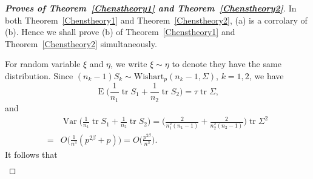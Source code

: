 \documentclass[review]{elsarticle}
\DeclareMathOperator{\mytr}{tr}
\DeclareMathOperator{\myE}{E}
\DeclareMathOperator{\myVar}{Var}
\theoremstyle{plain}
\theoremstyle{definition}
\theoremstyle{remark}
\begin{document}
\begin{proof}[\textbf{Proves of Theorem~\ref{Chenstheory1} and Theorem~\ref{Chenstheory2}}]
    In both Theorem~\ref{Chenstheory1} and Theorem~\ref{Chenstheory2}, (a) is a corrolary of (b).
    Hence we shall prove (b) of Theorem~\ref{Chenstheory1} and Theorem~\ref{Chenstheory2} simultaneously.

For random variable $\xi$ and $\eta$,
  we write $\xi\sim \eta$ to denote they have the same distribution.
    Since $(n_k-1)S_k\sim \text{Wishart}_p(n_k-1,\Sigma)$, $k=1,2$, we have %
%
    $$
 \myE\Big(\frac{1}{n_1}\mytr S_1+\frac{1}{n_2}\mytr S_2\Big)=\tau \mytr\Sigma,
    $$
    and
    $$
    \begin{aligned}
        &\myVar\Big(\frac{1}{n_1}\mytr S_1+\frac{1}{n_2}\mytr S_2\Big)=
        \Big(\frac{2}{n_1^2(n_1-1)}+\frac{2}{n_2^2(n_2-1)}\Big)\mytr \Sigma^2\\
        =&
    O\Big(\frac{1}{n^3}(p^{2\beta}+p)\Big)=O\Big(\frac{p^{2\beta}}{n^3}\Big).
    \end{aligned}
    $$
    It follows that
    $$
    \begin{aligned}

\end{aligned}$$
\end{proof}
\end{document}
